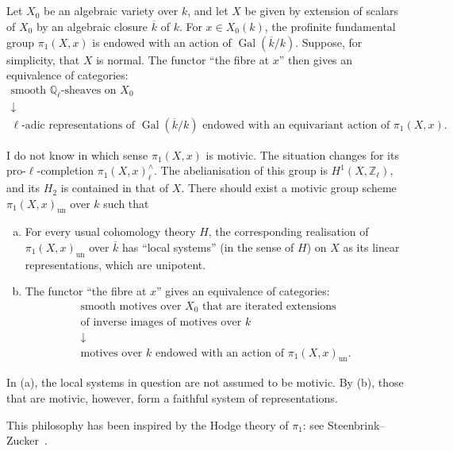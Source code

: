 \documentclass{article}
\theoremstyle{plain}
\theoremstyle{definition}
\newcommand{\ZZ}{\mathbb{Z}}
\newcommand{\QQ}{\mathbb{Q}}
\newcommand{\un}{\mathrm{un}}
\DeclareMathOperator{\Gal}{Gal}
\newcommand{\oldpage}[1]{\marginpar{\footnotesize$\Big\vert$ \textit{p.~#1}}}
\begin{document}
\subsection{}
\label{2.2}

Let $X_0$ be an algebraic variety over $k$, and let $X$ be given by extension of scalars of $X_0$ by an algebraic closure $\overline{k}$ of $k$.
For $x\in X_0(k)$, the profinite fundamental group $\pi_1(X,x)$ is endowed with an action of $\Gal(\overline{k}/k)$.
Suppose, for simplicity, that $X$ is normal.
The functor ``the fibre at $x$'' then gives an equivalence of categories:
\[
  \begin{gathered}
  \mbox{smooth $\QQ_\ell$-sheaves on $X_0$}
\\\downarrow
\\\mbox{$\ell$-adic representations of $\Gal(\overline{k}/k)$ endowed with an equivariant action of $\pi_1(X,x)$.}
  \end{gathered}
\]

\oldpage{153}
I do not know in which sense $\pi_1(X,x)$ is motivic.
The situation changes for its pro-$\ell$-completion $\pi_1(X,x)_\ell^\wedge$.
The abelianisation of this group is $H^1(X,\ZZ_\ell)$, and its $H_2$ is contained in that of $X$.
There should exist a motivic group scheme $\pi_1(X,x)_\un$ over $k$ such that
\begin{enumerate}[(a)]
  \item For every usual cohomology theory $H$, the corresponding realisation of $\pi_1(X,x)_\un$ over $\overline{k}$ has ``local systems'' (in the sense of $H$) on $X$ as its linear representations, which are unipotent.
  \item The functor ``the fibre at $x$'' gives an equivalence of categories:
    \[
      \begin{gathered}
        \mbox{smooth motives over $X_0$ that are iterated extensions}
      \\\mbox{of inverse images of motives over $k$}
      \\\downarrow
      \\\mbox{motives over $k$ endowed with an action of $\pi_1(X,x)_\un$.}
      \end{gathered}
    \]
\end{enumerate}

In (a), the local systems in question are not assumed to be motivic.
By (b), those that are motivic, however, form a faithful system of representations.

This philosophy has been inspired by the Hodge theory of $\pi_1$: see Steenbrink--Zucker~\cite{30}.
\end{document}
